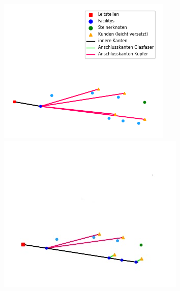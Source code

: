 \documentclass[11pt,a4paper]{article}
\theoremstyle{my_th_style1}
\begin{document}
\begin{figure}[h]
	\centering
	\begin{minipage}[b]{0.4\textwidth}
		\includegraphics[width=\textwidth]{./Bilder/P2PGK_Naunyn_demand1_duration0}
	\end{minipage}
	\begin{minipage}[b]{0.4\textwidth}
		\includegraphics[width=\textwidth]{./Bilder/P2PGK_Naunyn_demand1_5_duration0}
	\end{minipage}
	\begin{minipage}[b]{0.4\textwidth}

\end{minipage}
\end{figure}
\end{document}
